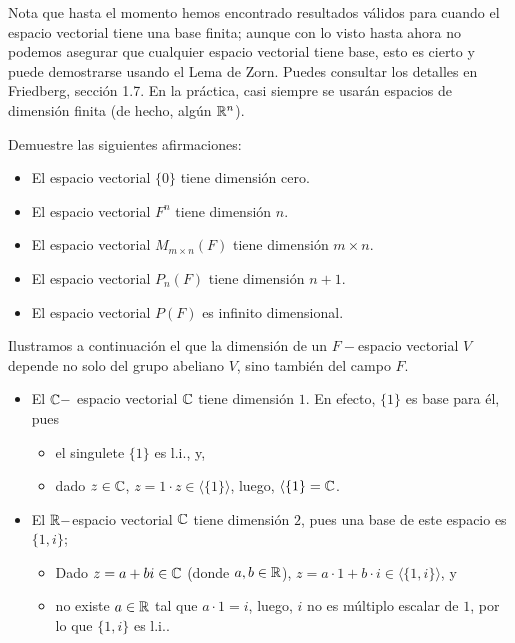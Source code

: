 Nota que hasta el momento hemos encontrado resultados válidos
para cuando el espacio vectorial tiene una base finita; aunque 
con lo visto hasta ahora no podemos asegurar que cualquier
espacio vectorial tiene base, esto es cierto y puede
demostrarse usando el Lema de Zorn. Puedes consultar los
detalles en Friedberg, sección 1.7.
En la práctica, casi siempre se usarán espacios de dimensión
finita (de hecho, algún $\mathbb{R}^{n}$).


\begin{ejem}
Demuestre las siguientes afirmaciones:
\begin{itemize}
	\item El espacio vectorial $\{ 0 \}$ tiene dimensión cero.
	\item El espacio vectorial $F^{n}$ tiene dimensión $n$.
	\item El espacio vectorial $M_{m \times n} (F)$ tiene dimensión
	$m \times n$.
	\item El espacio vectorial $P_{n}(F)$ tiene dimensión
	$n+1$.
	\item El espacio vectorial $P(F)$ es infinito dimensional.
\end{itemize}
\end{ejem}


\begin{ejem}
Ilustramos a continuación el que la dimensión de un
$F-$espacio vectorial $V$ depende no solo del grupo abeliano $V$,
sino también del campo $F$.
\begin{itemize}
	\item El $\mathbb{C}-$ espacio vectorial $\mathbb{C}$ tiene dimensión $1$.
	En efecto, $\{ 1 \}$ es base para él, pues
	\begin{itemize}
		\item el singulete $\{ 1 \}$ es l.i., y,
		\item dado $z \in \mathbb{C}$, $z = 1 \cdot z \in \langle \{ 1 \} \rangle$,
		luego, $\langle \{ 1 \} = \mathbb{C}$.
	\end{itemize}
	\item El $\mathbb{R}-$espacio vectorial $\mathbb{C}$ tiene dimensión $2$,
	pues una base de este espacio es $\{ 1, i \}$;
	\begin{itemize}
		\item Dado $z = a + b i \in \mathbb{C}$ (donde $a, b \in \mathbb{R}$),
		$z = a \cdot 1 + b \cdot i \in \langle \{ 1, i \} \rangle$, y
		\item no existe $a \in \mathbb{R}$ tal que $a \cdot 1 = i$, luego,
		$i$ no es múltiplo escalar de $1$, por lo que 
		$\{ 1, i \}$ es l.i..
	\end{itemize}
\end{itemize}
\end{ejem}

